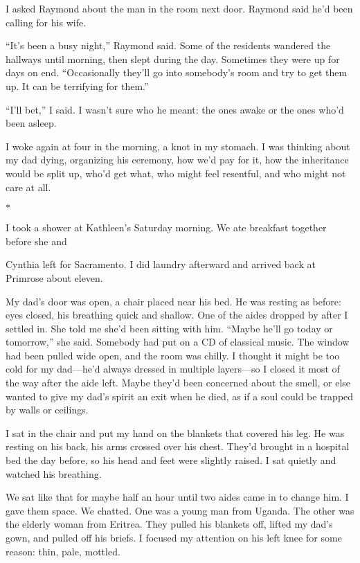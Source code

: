 \documentclass[12pt]{book}
\begin{document}
I asked Raymond about the man in the room next door. Raymond said he'd been calling for his wife.

``It's been a busy night,'' Raymond said. Some of the residents wandered the hallways until morning, then slept during the day. Sometimes they were up for days on end. ``Occasionally they'll go into somebody's room and try to get them up. It can be terrifying for them.''

``I'll bet,'' I said. I wasn't sure who he meant: the ones awake or the ones who'd been asleep.

I woke again at four in the morning, a knot in my stomach. I was thinking about my dad dying, organizing his ceremony, how we'd pay for it, how the inheritance would be split up, who'd get what, who might feel resentful, and who might not care at all.

\begin{center}$*$\end{center}

I took a shower at Kathleen's Saturday morning. We ate breakfast together before she and

Cynthia left for Sacramento. I did laundry afterward and arrived back at Primrose about eleven.

My dad's door was open, a chair placed near his bed. He was resting as before: eyes closed, his breathing quick and shallow. One of the aides dropped by after I settled in. She told me she'd been sitting with him. ``Maybe he'll go today or tomorrow,'' she said. Somebody had put on a CD of classical music. The window had been pulled wide open, and the room was chilly. I thought it might be too cold for my dad---he'd always dressed in multiple layers---so I closed it most of the way after the aide left. Maybe they'd been concerned about the smell, or else wanted to give my dad's spirit an exit when he died, as if a soul could be trapped by walls or ceilings.

I sat in the chair and put my hand on the blankets that covered his leg. He was resting on his back, his arms crossed over his chest. They'd brought in a hospital bed the day before, so his head and feet were slightly raised. I sat quietly and watched his breathing.

We sat like that for maybe half an hour until two aides came in to change him. I gave them space. We chatted. One was a young man from Uganda. The other was the elderly woman from Eritrea. They pulled his blankets off, lifted my dad's gown, and pulled off his briefs. I focused my attention on his left knee for some reason: thin, pale, mottled.
\end{document}
